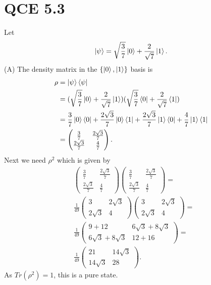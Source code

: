 \documentclass[10pt]{article}
\begin{document}
\section*{QCE 5.3}
Let
\[
\ket{\psi} = \sqrt{\frac{3}{7}} \ket{0} + \frac{2}{\sqrt{7}} \ket{1}.
\]
(A) The density matrix in the $\{ \ket{0}, \ket{1} \}$ basis is
\begin{align*}
\rho &= \ket{\psi} \bra{\psi} \\
        &= (\sqrt{\frac{3}{7}} \ket{0} + \frac{2}{\sqrt{7}} \ket{1})( \sqrt{\frac{3}{7}} \bra{0} + \frac{2}{\sqrt{7}} \bra{1}) \\
        &= \frac{3}{7} \ket{0}\bra{0} + \frac{2\sqrt{3}}{7} \ket{0}\bra{1} + \frac{2\sqrt{3}}{7} \ket{1}\bra{0} + \frac{4}{7} \ket{1}\bra{1} \\
        &=  \begin{pmatrix}
        \frac{3}{7} & \frac{2\sqrt{3}}{7} \\
        \frac{2\sqrt{3}}{7} & \frac{4}{7}
        \end{pmatrix}.
\end{align*}
Next we need $\rho^2$ which is given by
\begin{align*}
& \begin{pmatrix}
     \frac{3}{7} & \frac{2\sqrt{3}}{7} \\
     \frac{2\sqrt{3}}{7} & \frac{4}{7}
\end{pmatrix}
\begin{pmatrix}
     \frac{3}{7} & \frac{2\sqrt{3}}{7} \\
     \frac{2\sqrt{3}}{7} & \frac{4}{7}
\end{pmatrix} = \\
& \frac{1}{49} \begin{pmatrix}
3 & 2\sqrt{3} \\
2\sqrt{3} & 4
\end{pmatrix}
\begin{pmatrix}
3 & 2\sqrt{3} \\
2\sqrt{3} & 4
\end{pmatrix} = \\
& \frac{1}{49}
\begin{pmatrix}
9 + 12 & 6\sqrt{3} + 8\sqrt{3} \\
6\sqrt{3} + 8\sqrt{3} & 12 + 16
\end{pmatrix} = \\
& \frac{1}{49}
\begin{pmatrix}
21 & 14\sqrt{3} \\
14 \sqrt{3}  & 28
\end{pmatrix}.
\end{align*}
As $Tr(\rho^2) = 1$, this is a pure state.
\end{document}

